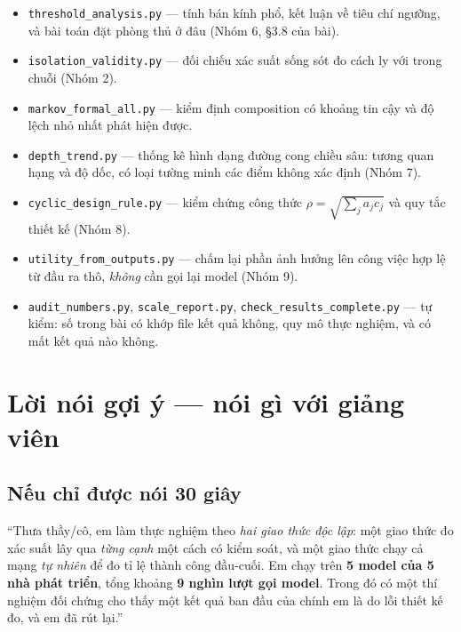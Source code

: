 \documentclass[11pt,a4paper]{article}
\begin{document}
\begin{itemize}
  \item \texttt{threshold\_analysis.py} --- tính bán kính phổ, kết luận về tiêu chí ngưỡng,
        và bài toán đặt phòng thủ ở đâu (Nhóm 6, §3.8 của bài).
  \item \texttt{isolation\_validity.py} --- đối chiếu xác suất sống sót đo cách ly với
        trong chuỗi (Nhóm 2).
  \item \texttt{markov\_formal\_all.py} --- kiểm định composition có khoảng tin cậy và
        độ lệch nhỏ nhất phát hiện được.
  \item \texttt{depth\_trend.py} --- thống kê hình dạng đường cong chiều sâu: tương quan
        hạng và độ dốc, có loại tường minh các điểm không xác định (Nhóm 7).
  \item \texttt{cyclic\_design\_rule.py} --- kiểm chứng công thức
        $\rho=\sqrt{\sum_j a_jc_j}$ và quy tắc thiết kế (Nhóm 8).
  \item \texttt{utility\_from\_outputs.py} --- chấm lại phần ảnh hưởng lên công việc hợp lệ
        từ đầu ra thô, \emph{không} cần gọi lại model (Nhóm 9).
  \item \texttt{audit\_numbers.py}, \texttt{scale\_report.py},
        \texttt{check\_results\_complete.py} --- tự kiểm: số trong bài có khớp file kết quả
        không, quy mô thực nghiệm, và có mất kết quả nào không.
\end{itemize}

\vspace{0.4cm}
\begin{center}
\end{center}

\section{Lời nói gợi ý --- nói gì với giảng viên}

\subsection*{Nếu chỉ được nói 30 giây}
``Thưa thầy/cô, em làm thực nghiệm theo \emph{hai giao thức độc lập}: một giao thức đo
xác suất lây qua \emph{từng cạnh} một cách có kiểm soát, và một giao thức chạy cả mạng
\emph{tự nhiên} để đo tỉ lệ thành công đầu-cuối. Em chạy trên \textbf{5 model của 5 nhà
phát triển}, tổng khoảng \textbf{9 nghìn lượt gọi model}. Trong đó có một thí nghiệm đối
chứng cho thấy một kết quả ban đầu của chính em là do lỗi thiết kế đo, và em đã rút lại.''
\end{document}
